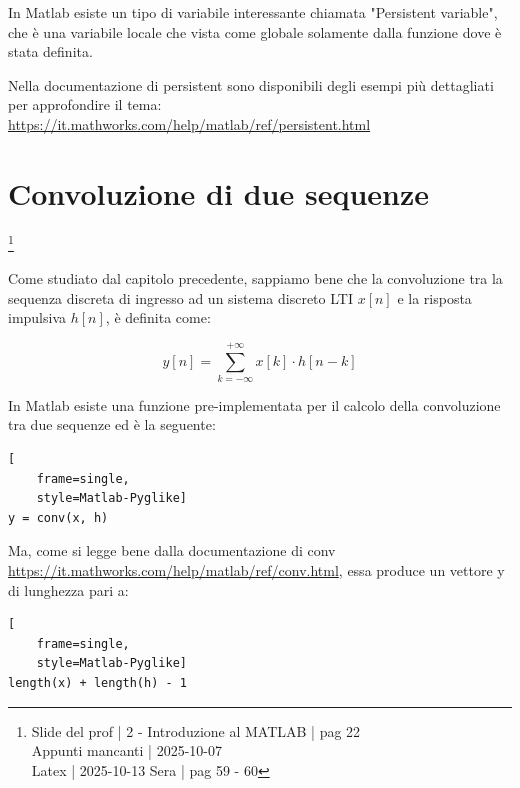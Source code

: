 In Matlab esiste un tipo di variabile interessante chiamata "Persistent variable", 
che è una variabile locale che vista come globale solamente dalla funzione dove è stata definita. \newline 

\begin{tcolorbox}
    Nella documentazione di persistent sono disponibili degli esempi più dettagliati per approfondire il tema: \\ 
    \url{https://it.mathworks.com/help/matlab/ref/persistent.html}
\end{tcolorbox}

\newpage 

\section{Convoluzione di due sequenze}

\footnote{ 
    Slide del prof | 2 - Introduzione al MATLAB | pag 22\\
    Appunti mancanti | 2025-10-07 \\ 
    Latex | 2025-10-13 Sera | pag 59 - 60
}

Come studiato dal capitolo precedente, sappiamo bene che 
la convoluzione tra la sequenza discreta di ingresso ad un sistema discreto LTI $x \left[ n\right]$ e la risposta impulsiva $h \left[ n\right]$, 
è definita come: 

{
    \Large 
    \begin{equation}
        y \left[ n\right] 
        = 
        \sum_{k = - \infty}^{+ \infty}
        x \left[ k\right]
        \cdot 
        h \left[ n - k\right]
    \end{equation}
}

In Matlab esiste una funzione pre-implementata per il calcolo della convoluzione tra due sequenze ed è la seguente: 

{
    \Large 
    \begin{lstlisting}[
    frame=single,
    style=Matlab-Pyglike]
y = conv(x, h)
\end{lstlisting}
}

Ma, come si legge bene dalla documentazione di conv \url{https://it.mathworks.com/help/matlab/ref/conv.html}, 
essa produce un vettore y di lunghezza pari a: 

{
    \Large 
    \begin{lstlisting}[
    frame=single,
    style=Matlab-Pyglike]
length(x) + length(h) - 1
\end{lstlisting}
} 

